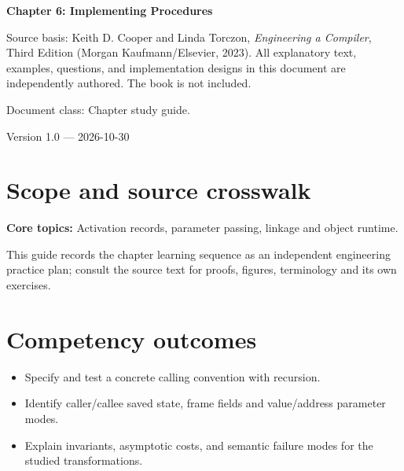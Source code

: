 \documentclass[10pt,letterpaper]{article}
\begin{document}
\begin{titlepage}
\centering\vspace*{1.0in}
{\Huge\bfseries\textcolor{CompilerBlue}{Chapter 6: Implementing Procedures}\par}
\vspace{.22in}{\Large Critical reading, original exercises, evidence and review\par}
\vspace{.4in}{\large Compiler Engineering Documentation Suite\par}
\vfill
\begin{minipage}{.86\linewidth}\small
Source basis: Keith D. Cooper and Linda Torczon, \emph{Engineering a Compiler}, Third Edition (Morgan Kaufmann/Elsevier, 2023). All explanatory text, examples, questions, and implementation designs in this document are independently authored. The book is not included.\par\medskip
Document class: Chapter study guide.
\end{minipage}
\vfill\textcolor{CompilerGray}{Version 1.0 --- 2026-10-30}\par
\end{titlepage}
\tableofcontents\clearpage
\section{Scope and source crosswalk}
\textbf{Core topics:} Activation records, parameter passing, linkage and object runtime.

This guide records the chapter learning sequence as an independent engineering practice plan; consult the source text for proofs, figures, terminology and its own exercises.

\section{Competency outcomes}
\begin{itemize}
\item Specify and test a concrete calling convention with recursion.
\item Identify caller/callee saved state, frame fields and value/address parameter modes.
\item Explain invariants, asymptotic costs, and semantic failure modes for the studied transformations.
\end{itemize}
\end{document}
